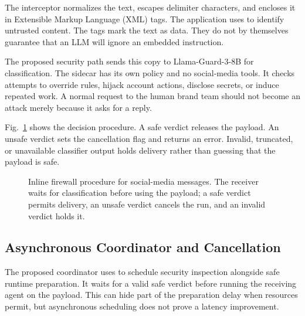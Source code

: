 \documentclass[conference]{IEEEtran}
\newcommand{\code}[1]{\texttt{\detokenize{#1}}}
\begin{document}
The interceptor normalizes the text, escapes delimiter characters, and encloses it in Extensible Markup Language (XML) tags. The application uses \code{<untrusted_payload>} to identify untrusted content. The tags mark the text as data. They do not by themselves guarantee that an LLM will ignore an embedded instruction.

The proposed security path sends this copy to Llama-Guard-3-8B for classification. The sidecar has its own policy and no social-media tools. It checks attempts to override rules, hijack account actions, disclose secrets, or induce repeated work. A normal request to the human brand team should not become an attack merely because it asks for a reply.

Fig.~\ref{fig:lifecycle} shows the decision procedure. A safe verdict releases the payload. An unsafe verdict sets the cancellation flag and returns an error. Invalid, truncated, or unavailable classifier output holds delivery rather than guessing that the payload is safe.

\begin{figure}[t]
\centering
{}
\caption{Inline firewall procedure for social-media messages. The receiver waits for classification before using the payload; a safe verdict permits delivery, an unsafe verdict cancels the run, and an invalid verdict holds it.}
\label{fig:lifecycle}
\end{figure}

\subsection{Asynchronous Coordinator and Cancellation}
The proposed coordinator uses \code{asyncio.create_task} to schedule security inspection alongside safe runtime preparation. It waits for a valid safe verdict before running the receiving agent on the payload. This can hide part of the preparation delay when resources permit, but asynchronous scheduling does not prove a latency improvement.
\end{document}
